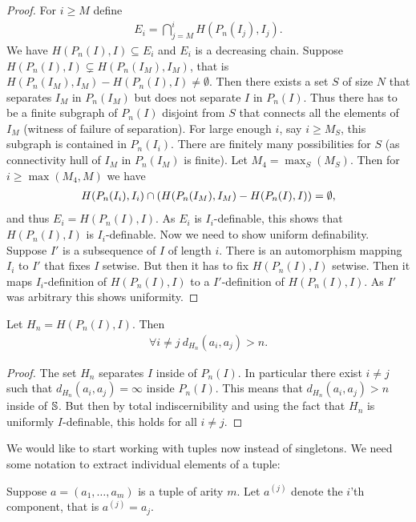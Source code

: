 \begin{proof}
  For $i \geq M$ define
  \begin{align*}
    E_i = \bigcap_{j = M}^{i} H(P_n(I_j), I_j).
  \end{align*}
  We have $H(P_n(I), I) \subseteq E_i$ and $E_i$ is a decreasing chain.
  Suppose $H(P_n(I), I) \subsetneq H(P_n(I_M), I_M)$, that is ${H(P_n(I_M), I_M) - H(P_n(I), I)} \neq \emptyset$.
  Then there exists a set $S$ of size $N$ that separates $I_M$ in $P_n(I_M)$ but does not separate $I$ in $P_n(I)$.
  Thus there has to be a finite subgraph of $P_n(I)$ disjoint from $S$ that connects all the elements of $I_M$ (witness of failure of separation).
  For large enough $i$, say $i \geq M_S$, this subgraph is contained in $P_n(I_i)$.
  There are finitely many possibilities for $S$ (as connectivity hull of $I_M$ in $P_n(I_M)$ is finite).
  Let $M_4 = \max_S(M_S)$.
  Then for $i \geq \max(M_4, M)$ we have
  \begin{align*}
    H(P_n(I_i), I_i) \cap \left(H(P_n(I_M), I_M) - H(P_n(I), I)\right) = \emptyset,    
  \end{align*}
  and thus $E_i = H(P_n(I), I)$.
  As $E_i$ is $I_i$-definable, this shows that $H(P_n(I), I)$ is $I_i$-definable.
  Now we need to show uniform definability.
  Suppose $I'$ is a subsequence of $I$ of length $i$.
  There is an automorphism mapping $I_i$ to $I'$ that fixes $I$ setwise.
  But then it has to fix $H(P_n(I), I)$ setwise.
  Then it maps $I_i$-definition of $H(P_n(I), I)$ to a $I'$-definition of $H(P_n(I), I)$.
  As $I'$ was arbitrary this shows uniformity.
\end{proof}

\begin{Corollary} \label{inf_dis}
  Let $H_n = H(P_n(I), I)$.
  Then 
  \begin{align*}
    \forall i \neq j \ d_{H_n}(a_i, a_j) > n.
  \end{align*}
\end{Corollary}

\begin{proof}
  The set $H_n$ separates $I$ inside of $P_n(I)$.
  In particular there exist $i \neq j$ such that $d_{H_n}(a_i, a_j) = \infty$ inside $P_n(I)$.
  This means that $d_{H_n}(a_i, a_j) > n$ inside of $\mathbb S$.
  But then by total indiscernibility and using the fact that $H_n$ is uniformly $I$-definable, this holds for all $i \neq j$.
\end{proof}

\newcommand{\tpl}[2]{{#1}^{(#2)}}

We would like to start working with tuples now instead of singletons.
We need some notation to extract individual elements of a tuple:
\begin{Definition}
  Suppose $a = (a_1, \ldots, a_m)$ is a tuple of arity $m$.
  Let $\tpl{a}{j}$ denote the $i$'th component, that is $\tpl{a}{j} = a_j$.
\end{Definition}


